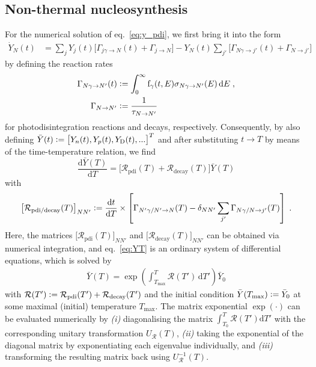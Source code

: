 \documentclass[11pt,a4paper]{article}
\newcommand{\fpdi}{\mathrm{f}}
\renewcommand{\d}{\text{d}}
\newcommand{\eqsp}{\;}
\newcommand{\ldefine}{\vcentcolon=}
\begin{document}
\subsection{Non-thermal nucleosynthesis}
For the numerical solution of eq.~\eqref{eq:y_pdi}, we first bring it into the form
\begin{align}
\dot{Y}_N(t) & = \sum_{j} Y_{j}(t) \big[\Gamma_{j\gamma \rightarrow N}(t) + \Gamma_{j \rightarrow N}\big] - Y_N(t) \sum_{j'} \big[ \Gamma_{N\gamma \rightarrow j'}(t) + \Gamma_{N \rightarrow j'} \big]
\label{eq:y_pdi_redef}
\end{align}
by defining the reaction rates
\begin{align}
\Gamma_{N\gamma \rightarrow N'}(t) &\ldefine \int_0^\infty \fpdi_\gamma(t, E) \sigma_{N\gamma \rightarrow N'}(E)\,\d E\eqsp, \\
\Gamma_{N\rightarrow N'} &\ldefine \frac{1}{\tau_{N\rightarrow N'}}
\end{align}
for photodisintegration reactions and decays, respectively.
Consequently, by also defining $\bar{Y}(t) \ldefine \big[ Y_n(t), Y_p(t), Y_\text{D}(t), ... \big]^T$ and after substituting $t \rightarrow T$ by means of the time-temperature relation, we find
\begin{equation}
\frac{\d \bar{Y}(T)}{\d T} = \big[ \mathcal{R}_\text{pdi}(T) + \mathcal{R}_\text{decay}(T) \big] \bar{Y}(T)
\label{eq:YT}
\end{equation}
with 
\begin{align}
\big[ \mathcal{R}_\text{pdi/decay}(T)\big]_{N N'} \ldefine \frac{\d t}{\d T} \times \left[ \Gamma_{N'\gamma/N' \rightarrow N}(T)  - \delta_{N N'} \sum_{j'} \Gamma_{N\gamma/N\rightarrow j'}(T)\right]\eqsp.
\label{eq:rate_matrix}
\end{align}
Here, the matrices $\big[ \mathcal{R}_\text{pdi}(T)\big]_{N N'}$ and $\big[ \mathcal{R}_\text{decay}(T)\big]_{N N'}$ can be obtained via numerical integration, and eq.~\eqref{eq:YT} is an ordinary system of differential equations, which is solved by
\begin{align}
\bar{Y}(T) = \exp\left(\int_{T_\text{max}}^T \mathcal{R}(T')\,\d T'\right)\bar{Y}_0
\end{align}
with $\mathcal{R}(T') \ldefine \mathcal{R}_\text{pdi}(T') + \mathcal{R}_\text{decay}(T')$ and the initial condition $\bar{Y}(T_\text{max}) \ldefine \bar{Y}_0$ at some maximal (initial) temperature $T_\text{max}$. The matrix exponential $\exp(\cdot)$ can be evaluated numerically by \emph{(i)} diagonalising the matrix $\int_{T_0}^T \mathcal{R}(T')\d T'$ with the corresponding unitary transformation $U_{\mathcal{R}}(T)$, \emph{(ii)} taking the exponential of the diagonal matrix by exponentiating each eigenvalue individually, and \emph{(iii)} transforming the resulting matrix back using $U_{\mathcal{R}}^{-1}(T)$.
\end{document}
